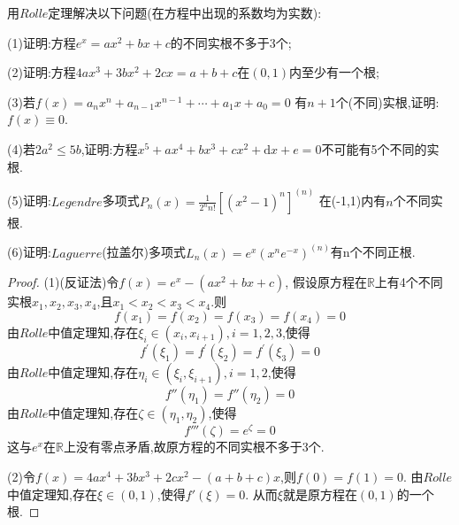 \documentclass[lang=cn,newtx,10pt,scheme=chinese]{../Template/elegantbook}
\begin{document}
\begin{exercise}\label{(ex:2.2)}
    用$Rolle$定理解决以下问题(在方程中出现的系数均为实数):

(1)证明:方程$e^x=ax^2+bx+c$的不同实根不多于3个;

(2)证明:方程$4ax^3+3bx^2+2cx=a+b+c$在$(0,1)$内至少有一个根;

(3)若$f\left( x \right) =a_nx^n+a_{n-1}x^{n-1}+\cdots +a_1x+a_0=0$
有$n+1$个(不同)实根,证明:$f(x)\equiv 0$.

(4)若$2a^2\le 5b$,证明:方程$x^5+ax^4+bx^3+cx^2+\mathrm{d}x+e=0$不可能有5个不同的实根.

(5)证明:$Legendre$多项式$P_n\left( x \right) =\frac{1}{2^nn!}\left[ \left( x^2-1 \right) ^n \right] ^{\left( n \right)}$
在(-1,1)内有$n$个不同实根.

(6)证明:$Laguerre$(拉盖尔)多项式$L_n\left( x \right) =e^x\left( x^ne^{-x} \right) ^{\left( n \right)}$有n个不同正根.

\begin{proof}
    (1)(反证法)令$f(x)=e^x-(ax^2+bx+c)$,
    假设原方程在$\mathbb{R}$上有4个不同实根$x_1,x_2,x_3,x_4$,且$x_1<x_2<x_3<x_4$.则
    \begin{equation}
        f(x_1)=f(x_2)=f(x_3)=f(x_4)=0
        \nonumber
    \end{equation}
    由$Rolle$中值定理知,存在$\xi_i\in(x_i,x_{i+1}),i=1,2,3$,使得
    \begin{equation}
        f^{\prime}(\xi_1)=f^{\prime}(\xi_2)=f^{\prime}(\xi_3)=0
        \nonumber
    \end{equation}
    由$Rolle$中值定理知,存在$\eta_i\in(\xi_i,\xi_{i+1}),i=1,2$,使得
    \begin{equation}
        f''(\eta_1)=f''(\eta_2)=0
        \nonumber
    \end{equation}
    由$Rolle$中值定理知,存在$\zeta\in(\eta_1,\eta_2)$,使得
    \begin{equation}
        f'''(\zeta)=e^\zeta=0
        \nonumber
    \end{equation}
    这与$e^x$在$\mathbb{R}$上没有零点矛盾,故原方程的不同实根不多于3个.

    (2)令$f(x)=4ax^4+3bx^3+2cx^2-(a+b+c)x$,则$f(0)=f(1)=0$.
    由$Rolle$中值定理知,存在$\xi\in(0,1)$,使得$f'(\xi)=0$.
    从而$\xi$就是原方程在$(0,1)$的一个根.


\end{proof}
\end{exercise}
\end{document}
